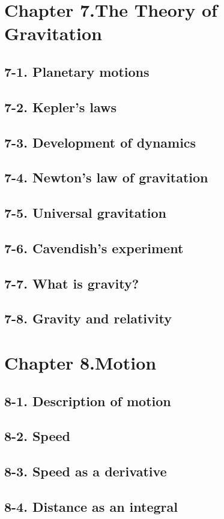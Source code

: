 \documentclass{article}
\begin{document}
\section{Chapter 7.The Theory of Gravitation}
\subsection{7-1. Planetary motions}
\subsection{7-2. Kepler’s laws}
\subsection{7-3. Development of dynamics}
\subsection{7-4. Newton’s law of gravitation}
\subsection{7-5. Universal gravitation}
\subsection{7-6. Cavendish’s experiment}
\subsection{7-7. What is gravity?}
\subsection{7-8. Gravity and relativity}
\section{Chapter 8.Motion}
\subsection{8-1. Description of motion}
\subsection{8-2. Speed}
\subsection{8-3. Speed as a derivative}
\subsection{8-4. Distance as an integral}
\end{document}
